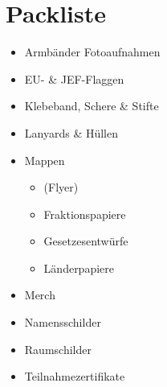 \documentclass{article}
\begin{document}
    \section{Packliste}
    \begin{itemize}
        \item Armbänder Fotoaufnahmen
        \item EU- \& JEF-Flaggen
        \item Klebeband, Schere \& Stifte
        \item Lanyards \& Hüllen
        \item Mappen
        \begin{itemize}
			\item (Flyer)
			\item Fraktionspapiere
			\item Gesetzesentwürfe
			\item Länderpapiere
        \end{itemize}
        \item Merch
        \item Namensschilder
        \item Raumschilder
        \item Teilnahmezertifikate
    \end{itemize}
    
    
    
    
    
    
    
    
    
\end{document}
